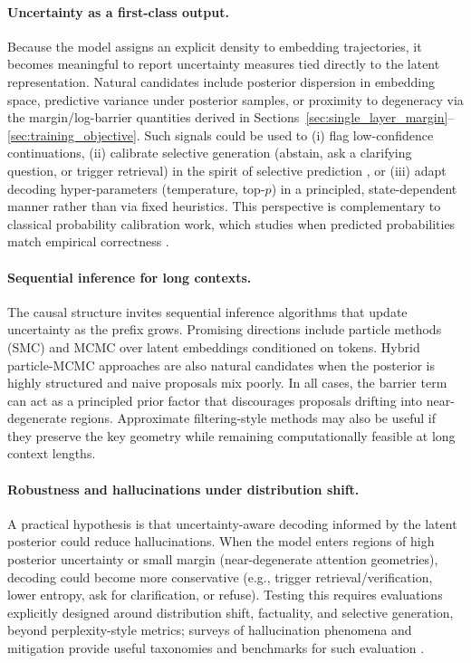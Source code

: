 \documentclass[11pt]{article}
\begin{document}
\paragraph{Uncertainty as a first-class output.}
Because the model assigns an explicit density to embedding trajectories, it becomes meaningful to report uncertainty measures tied directly to the latent representation.
Natural candidates include posterior dispersion in embedding space, predictive variance under posterior samples, or proximity to degeneracy via the margin/log-barrier quantities derived in Sections~\ref{sec:single_layer_margin}--\ref{sec:training_objective}.
Such signals could be used to (i) flag low-confidence continuations, (ii) calibrate selective generation (abstain, ask a clarifying question, or trigger retrieval) in the spirit of selective prediction \citep{GeifmanEl17}, or (iii) adapt decoding hyper-parameters (temperature, top-$p$) in a principled, state-dependent manner rather than via fixed heuristics.
This perspective is complementary to classical probability calibration work, which studies when predicted probabilities match empirical correctness \citep{GuoPlSuWe17}.

\paragraph{Sequential inference for long contexts.}
The causal structure invites sequential inference algorithms that update uncertainty as the prefix grows.
Promising directions include particle methods (SMC) \citep{DoucetDeGo01} and MCMC over latent embeddings conditioned on tokens.
Hybrid particle-MCMC approaches \citep{AndrieuDoHo10} are also natural candidates when the posterior is highly structured and naive proposals mix poorly.
In all cases, the barrier term can act as a principled prior factor that discourages proposals drifting into near-degenerate regions.
Approximate filtering-style methods may also be useful if they preserve the key geometry while remaining computationally feasible at long context lengths.

\paragraph{Robustness and hallucinations under distribution shift.}
A practical hypothesis is that uncertainty-aware decoding informed by the latent posterior could reduce hallucinations.
When the model enters regions of high posterior uncertainty or small margin (near-degenerate attention geometries), decoding could become more conservative (e.g., trigger retrieval/verification, lower entropy, ask for clarification, or refuse).
Testing this requires evaluations explicitly designed around distribution shift, factuality, and selective generation, beyond perplexity-style metrics; surveys of hallucination phenomena and mitigation provide useful taxonomies and benchmarks for such evaluation \citep{HuangYuMa23Etal}.
\end{document}
